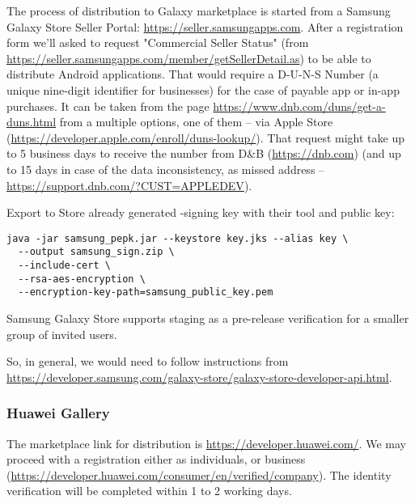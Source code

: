 The process of distribution to Galaxy marketplace is started from a Samsung Galaxy Store Seller Portal:
\href{https://seller.samsungapps.com}{https://seller.samsungapps.com}.
After a registration form we'll asked to request "Commercial Seller Status" (from 
\href{https://seller.samsungapps.com/member/getSellerDetail.as}{https://seller.samsungapps.com/member/getSellerDetail.as})
to be able to distribute Android applications. That would require a D-U-N-S Number (a unique nine-digit identifier for 
businesses) for the case of payable app or in-app purchases. It can be taken from the page 
\href{https://www.dnb.com/duns/get-a-duns.html}{ https://www.dnb.com/duns/get-a-duns.html}
from a multiple options, one of them -- via Apple Store 
(\href{https://developer.apple.com/enroll/duns-lookup/}{https://developer.apple.com/enroll/duns-lookup/}).
That request might take up to 5 business days to receive the number from D\&B (\href{https://dnb.com}{https://dnb.com})
(and up to 15 days in case of the data inconsistency, as missed address -- 
\href{https://support.dnb.com/?CUST=APPLEDEV}{https://support.dnb.com/?CUST=APPLEDEV}). 

Export to Store already generated -signing key with their tool and public key:

\begin{lstlisting}[language=terminal]
java -jar samsung_pepk.jar --keystore key.jks --alias key \
  --output samsung_sign.zip \
  --include-cert \
  --rsa-aes-encryption \
  --encryption-key-path=samsung_public_key.pem
\end{lstlisting}

\noindent Samsung Galaxy Store supports staging as a pre-release verification for a smaller group of invited users.

So, in general, we would need to follow instructions  from 
\href{https://developer.samsung.com/galaxy-store/galaxy-store-developer-api.html}{https://developer.samsung.com/galaxy-store/galaxy-store-developer-api.html}.


\subsubsection{Huawei Gallery}

The marketplace link for distribution is \href{https://developer.huawei.com/}{https://developer.huawei.com/}.
We may proceed with a registration either as individuals, or business 
(\href{https://developer.huawei.com/consumer/en/verified/company}{https://developer.huawei.com/consumer/en/verified/company}).
The identity verification will be completed within 1 to 2 working days.

